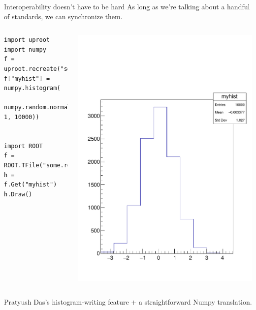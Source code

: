 \documentclass[aspectratio=169]{beamer}
\begin{document}
\begin{frame}[fragile]{Interoperability doesn't have to be hard}
\large
\vspace{0.25 cm}
As long as we're talking about a handful of standards, we can synchronize them.

\begin{columns}
\small
\vspace{-0.5 cm}
\begin{verbatim}
import uproot
import numpy
f = uproot.recreate("some.root")
f["myhist"] = numpy.histogram(
    numpy.random.normal(0, 1, 10000))


import ROOT
f = ROOT.TFile("some.root")
h = f.Get("myhist")
h.Draw()
\end{verbatim}
\hfill \includegraphics[width=\linewidth]{numpy-to-root.pdf}
\end{columns}

\large
Pratyush Das's histogram-writing feature $+$ a straightforward Numpy translation.
\end{frame}
\end{document}
